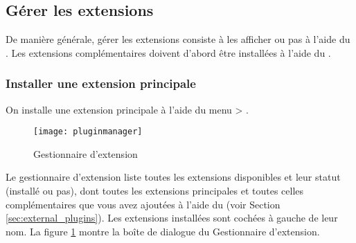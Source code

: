 \subsection{Gérer les extensions}\label{sec:managing_plugins}

De manière générale, gérer les extensions consiste à les afficher ou pas à l'aide du .
Les extensions complémentaires doivent d'abord être installées à l'aide du .

\subsubsection{Installer une extension principale}\label{sec:load_core_plugin} 

On installe une extension principale à l'aide du menu  > .

\begin{figure}[ht]
   \begin{center}
   \caption{Gestionnaire d'extension \nixcaption}\label{fig:pluginmanager}\smallskip   
   \texttt{[image: pluginmanager]}
\end{center}
\end{figure}

Le gestionnaire d'extension liste toutes les extensions disponibles et leur statut (installé ou pas), dont toutes les extensions principales et toutes celles complémentaires que vous avez ajoutées à l'aide du  (voir Section \ref{sec:external_plugins}). Les extensions installées sont cochées à gauche de leur nom. La figure \ref{fig:pluginmanager} montre la boîte de dialogue du Gestionnaire d'extension.

